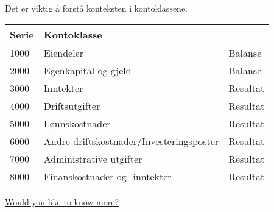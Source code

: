 Det er viktig å forstå konteksten i kontoklassene.
\begin{table}[h]
	\begin{tabular}[c]{l l l}
		Serie & Kontoklasse \\ \hline
		1000 & Eiendeler & Balanse \\
		2000 & Egenkapital og gjeld & Balanse \\
		3000 & Inntekter & Resultat \\
		4000 & Driftsutgifter & Resultat \\
		5000 & Lønnskostnader & Resultat \\
		6000 & Andre driftskostnader/Investeringsposter & Resultat \\
		7000 & Administrative utgifter & Resultat \\
		8000 & Finanskostnader og -inntekter & Resultat \\
	\end{tabular}
\end{table}



\hyperlink{ff_egenkap}{Would you like to know more?}